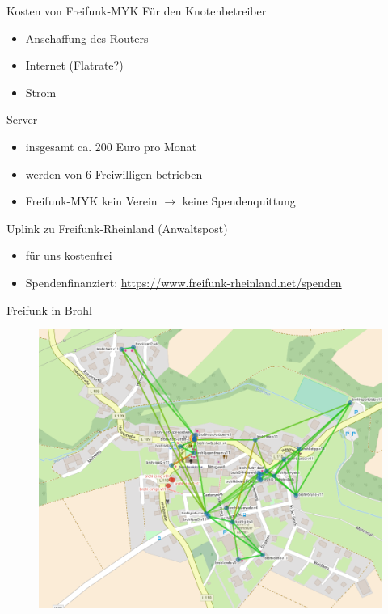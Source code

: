 \documentclass{beamer}
\begin{document}
\begin{frame}{Kosten von Freifunk-MYK}
Für den Knotenbetreiber
\begin{itemize}
\item Anschaffung des Routers
\item Internet (Flatrate?)
\item Strom
\end{itemize}
Server
\begin{itemize}
\item insgesamt ca. 200 Euro pro Monat
\item werden von 6 Freiwilligen betrieben
\item Freifunk-MYK kein Verein $\to$ keine Spendenquittung
\end{itemize}
Uplink zu Freifunk-Rheinland (Anwaltspost)
\begin{itemize}
\item für uns kostenfrei
\item Spendenfinanziert: \url{https://www.freifunk-rheinland.net/spenden}
\end{itemize}

\end{frame}

\begin{frame}{Freifunk in Brohl}
\begin{figure}
	\centering
\includegraphics[width=0.7\linewidth]{Bilder/Brohl}
\label{fig:brohl}
\end{figure}
\end{frame}
\end{document}
